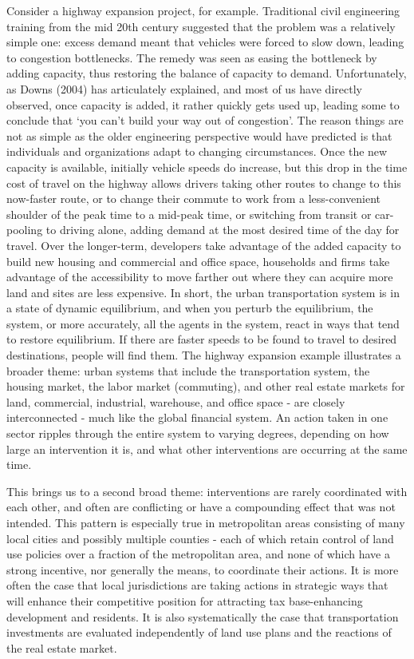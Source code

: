 Consider a highway expansion project, for example.  Traditional civil engineering training from the mid 20th century suggested that the problem was a relatively simple one: excess demand meant that vehicles were forced to slow down, leading to congestion bottlenecks.  The remedy was seen as easing the bottleneck by adding capacity, thus restoring the balance of capacity to demand.  Unfortunately, as Downs (2004) has articulately explained, and most of us have directly observed, once capacity is added, it rather quickly gets used up, leading some to conclude that `you can't build your way out of congestion'. The reason things are not as simple as the older engineering perspective would have predicted is that individuals and organizations adapt to changing circumstances.  Once the new capacity is available, initially vehicle speeds do increase, but this drop in the time cost of travel on the highway allows drivers taking other routes to change to this now-faster route, or to change their commute to work from a less-convenient shoulder of the peak time to a mid-peak time, or switching from transit or car-pooling to driving alone, adding demand at the most desired time of the day for travel.  Over the longer-term, developers take advantage of the added capacity to build new housing and commercial and office space, households and firms take advantage of the accessibility to move farther out where they can acquire more land and sites are less expensive.  In short, the urban transportation system is in a state of dynamic equilibrium, and when you perturb the equilibrium, the system, or more accurately, all the agents in the system, react in ways that tend to restore equilibrium.  If there are faster speeds to be found to travel to desired destinations, people will find them.
%
The highway expansion example illustrates a broader theme: urban systems that include the transportation system, the housing market, the labor market (commuting), and other real estate markets for land, commercial, industrial, warehouse, and office space - are closely interconnected - much like the global financial system.  An action taken in one sector ripples through the entire system to varying degrees, depending on how large an intervention it is, and what other interventions are occurring at the same time.

This brings us to a second broad theme: interventions are rarely coordinated with each other, and often are conflicting or have a compounding effect that was not intended.  This pattern is especially true in metropolitan areas consisting of many local cities and possibly multiple counties - each of which retain control of land use policies over a fraction of the metropolitan area, and none of which have a strong incentive, nor generally the means, to coordinate their actions.  It is more often the case that local jurisdictions are taking actions in strategic ways that will enhance their competitive position for attracting tax base-enhancing development and residents.  It is also systematically the case that transportation investments are evaluated independently of land use plans and the reactions of the real estate market.

